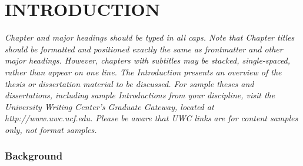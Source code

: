 \documentclass{UCF_ETD}
\begin{document}
\listoftables

\mainmatter

\chapter{INTRODUCTION} 
\textit{Chapter and major headings should be typed in all caps.  Note that Chapter titles should be formatted and positioned exactly the same as frontmatter and other major headings. However, chapters with subtitles may be stacked, single-spaced, rather than appear on one line.
The Introduction presents an overview of the thesis or dissertation material to be discussed. For sample theses and dissertations, including sample Introductions from your discipline, visit the University Writing Center’s Graduate Gateway, located at http://www.uwc.ucf.edu. Please be aware that UWC links are for content samples only, not format samples.
}

\begin{comment}
Notes and Guidance for Introduction
1. Background - Introduce readers to current state of DL/AI in communications. Talk about Evolution and Significance of real world datasets like deepsnse or others...
2. Problem Statement - Define the problem clearly -- Beam Prediction
3. Objective - Give the main objective of the thesis such as Beam Prediction and domain adaptation, using multimodal.

Multimodal Networks 
1. Theory and Significance - Discuss the role and importance of MM Networks in DL, with respect to Communications.
2. Application to Deepsense 6G -- How do MM Networks apply to dataset? Discuss how to integrate multiple types of data can enhance learning process
3. Technical Challenges of MM -- Data Fusion, synchronization, etc

Data and Communication Challenges
1. Characteristics of DeepSense Dataset - Describe data in detail -- composition, time-based measurements, etc.
2. Data Processing and Management - Challenges i`n Handling real-world data...noise filter, data cleanring, and data integrity
3. Communication Specific Challenges -- Beamforming prediction, signal interference, etc.
\end{comment}

\subsection{Background}
\end{document}
